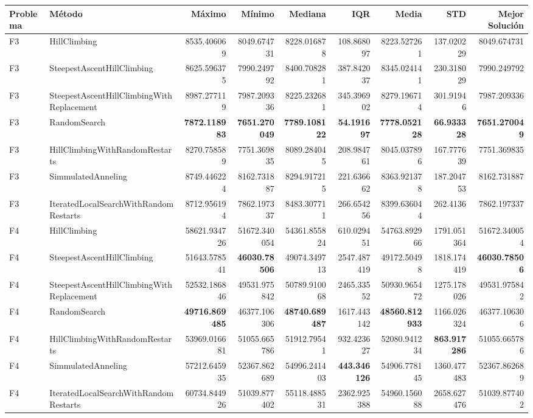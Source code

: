 \begin{tabular}{llrrrrrrr}
\toprule
Problema & Método & Máximo & Mínimo & Mediana & IQR & Media & STD & Mejor Solución \\ 
\midrule
F3 & HillClimbing & 8535.406069 & 8049.674731 & 8228.016878 & 108.868097 & 8223.527261 & 137.020229 & 8049.674731 \\ 
F3 & SteepestAscentHillClimbing & 8625.596375 & 7990.249792 & 8400.708281 & 387.842037 & 8345.024141 & 230.318029 & 7990.249792 \\ 
F3 & SteepestAscentHillClimbingWithReplacement & 8987.277119 & 7987.209336 & 8225.232681 & 345.396902 & 8279.196714 & 301.91946 & 7987.209336 \\ 
F3 & RandomSearch & \textbf{7872.118983} & \textbf{7651.270049} & \textbf{7789.108122} & \textbf{54.191697} & \textbf{7778.052128} & \textbf{66.933328} & \textbf{7651.270049} \\ 
F3 & HillClimbingWithRandomRestarts & 8270.758589 & 7751.369835 & 8089.284045 & 208.984761 & 8045.037896 & 167.777639 & 7751.369835 \\ 
F3 & SimmulatedAnneling & 8749.446224 & 8162.731887 & 8294.917215 & 221.636662 & 8363.921378 & 187.204753 & 8162.731887 \\ 
F3 & IteratedLocalSearchWithRandomRestarts & 8712.956194 & 7862.197337 & 8483.307711 & 266.654256 & 8399.636044 & 262.4136 & 7862.197337 \\ 
F4 & HillClimbing & 58621.934726 & 51672.340054 & 54361.855824 & 610.029451 & 54763.892966 & 1791.051364 & 51672.340054 \\ 
F4 & SteepestAscentHillClimbing & 51643.578541 & \textbf{46030.78506} & 49074.349713 & 2547.487419 & 49172.50498 & 1818.174419 & \textbf{46030.78506} \\ 
F4 & SteepestAscentHillClimbingWithReplacement & 52532.186846 & 49531.975842 & 50789.910068 & 2465.33552 & 50930.965472 & 1275.178026 & 49531.975842 \\ 
F4 & RandomSearch & \textbf{49716.869485} & 46377.106306 & \textbf{48740.689487} & 1617.443142 & \textbf{48560.812933} & 1166.026324 & 46377.106306 \\ 
F4 & HillClimbingWithRandomRestarts & 53969.016681 & 51055.665786 & 51912.79541 & 932.423627 & 52080.941234 & \textbf{863.917286} & 51055.665786 \\ 
F4 & SimmulatedAnneling & 57212.645935 & 52367.862689 & 54996.241403 & \textbf{443.346126} & 54906.778145 & 1360.477483 & 52367.862689 \\ 
F4 & IteratedLocalSearchWithRandomRestarts & 60734.844926 & 51039.877402 & 55118.488531 & 2362.925388 & 54960.156088 & 2658.627476 & 51039.877402 \\ 

\end{tabular}
